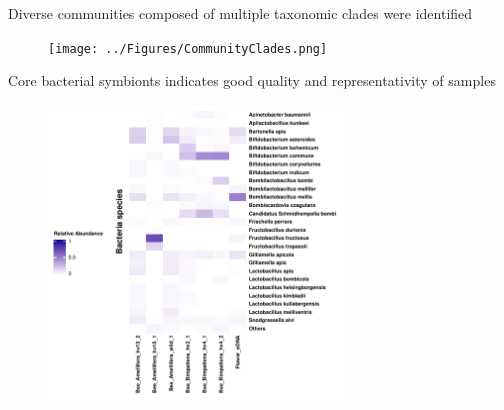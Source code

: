 \documentclass{beamer}
\begin{document}
\begin{frame}{Diverse communities composed of multiple taxonomic clades were identified}
    \begin{figure}[H]
       \texttt{[image: ../Figures/CommunityClades.png]}
        \label{GroupAbundance}
        \end{figure}
\end{frame}

\begin{frame}{Core bacterial symbionts indicates good quality and representativity of samples}
    \begin{figure}[H]
        \centering
        \includegraphics[width=0.7\textwidth]{../Figures/RelativeAbundance_0_01_species_Bacteria.pdf}
        \label{BacteriaHeatmap}
    \end{figure}
\end{frame}
\end{document}
